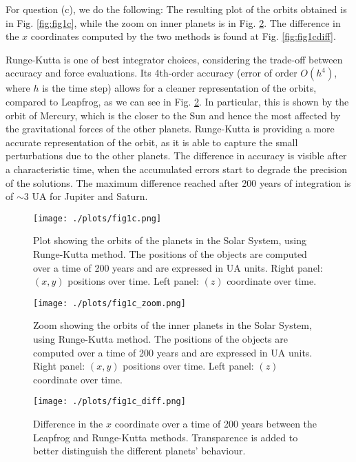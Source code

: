 For question (c), we do the following: 
The resulting plot of the orbits obtained is in Fig. \ref{fig:fig1c}, while the zoom on inner planets is in Fig. \ref{fig:fig1czoom}. The difference in the $x$ coordinates computed by the two methods is found at Fig. \ref{fig:fig1cdiff}.

Runge-Kutta is one of best integrator choices, considering the trade-off between accuracy and force evaluations. 
Its 4th-order accuracy (error of order $O(h^{4})$, where $h$ is the time step) allows for a cleaner representation of the orbits, compared to Leapfrog, as we can see in Fig. \ref{fig:fig1czoom}. 
In particular, this is shown by the orbit of Mercury, which is the closer to the Sun and hence the most affected by the gravitational forces of the other planets. 
Runge-Kutta is providing a more accurate representation of the orbit, as it is able to capture the small perturbations due to the other planets.
The difference in accuracy is visible after a characteristic time, when the accumulated errors start to degrade the precision of the solutions.
The maximum difference reached after 200 years of integration is of $\sim 3$ UA for Jupiter and Saturn. 

\begin{figure}[h!]
    \centering
    \texttt{[image: ./plots/fig1c.png]}
    \caption{Plot showing the orbits of the planets in the Solar System, using Runge-Kutta method.
    The positions of the objects are computed over a time of 200 years and are expressed in UA units. Right panel: $(x,y)$ positions over time. Left panel: $(z)$ coordinate over time.} 
    \label{fig:fig1b}
  \end{figure}

  \begin{figure}[h!]
    \centering
    \texttt{[image: ./plots/fig1c\_zoom.png]}
    \caption{Zoom showing the orbits of the inner planets in the Solar System, using Runge-Kutta method.
    The positions of the objects are computed over a time of 200 years and are expressed in UA units. Right panel: $(x,y)$ positions over time. Left panel: $(z)$ coordinate over time.} 
    \label{fig:fig1czoom}
  \end{figure}

  \begin{figure}[h!]
    \centering
    \texttt{[image: ./plots/fig1c\_diff.png]}
    \caption{Difference in the $x$ coordinate over a time of 200 years between the Leapfrog and Runge-Kutta methods. Transparence is added to better distinguish the different planets' behaviour.} 
    \label{fig:fig1bdiff}
  \end{figure}

